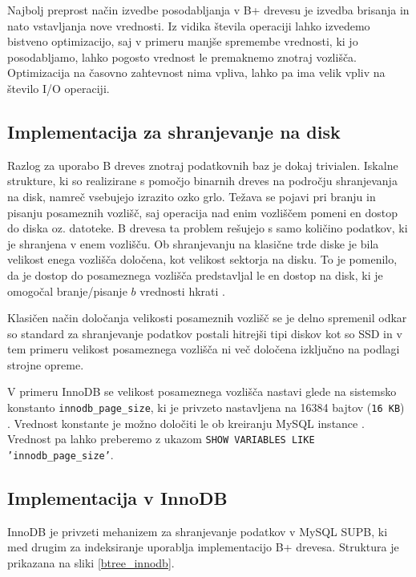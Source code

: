 \documentclass[a4paper,12pt,openright]{book}
\begin{document}
        Najbolj preprost način izvedbe posodabljanja v B+ drevesu je izvedba brisanja in nato vstavljanja nove vrednosti. Iz vidika števila operaciji lahko izvedemo bistveno optimizacijo, saj v primeru manjše spremembe vrednosti, ki jo posodabljamo, lahko pogosto vrednost le premaknemo znotraj vozlišča. Optimizacija na časovno zahtevnost nima vpliva, lahko pa ima velik vpliv na število I/O operaciji.

        \subsection{Implementacija za shranjevanje na disk}
        Razlog za uporabo B dreves znotraj podatkovnih baz je dokaj trivialen. Iskalne strukture, ki so realizirane s pomočjo binarnih dreves na področju shranjevanja na disk, namreč vsebujejo izrazito ozko grlo. Težava se pojavi pri branju in pisanju posameznih vozlišč, saj operacija nad enim vozliščem pomeni en dostop do diska oz. datoteke. B drevesa ta problem rešujejo s samo količino podatkov, ki je shranjena v enem vozlišču. Ob shranjevanju na klasične trde diske je bila velikost enega vozlišča določena, kot velikost sektorja na disku. To je pomenilo, da je dostop do posameznega vozlišča predstavljal le en dostop na disk, ki je omogočal branje/pisanje $b$ vrednosti hkrati \cite{goodrich2011data}.

        Klasičen način določanja velikosti posameznih vozlišč se je delno spremenil odkar so standard za shranjevanje podatkov postali hitrejši tipi diskov kot so SSD in v tem primeru velikost posameznega vozlišča ni več določena izključno na podlagi strojne opreme. 
        
        V primeru InnoDB se velikost posameznega vozlišča nastavi glede na sistemsko konstanto {\tt innodb\_page\_size}, ki je privzeto nastavljena na \num{16384} bajtov ({\tt 16 KB}) \cite{INOODB_PS}. Vrednost konstante je možno določiti le ob kreiranju MySQL instance \cite{MYSQL_SETUP}. Vrednost pa lahko preberemo z ukazom {\tt SHOW VARIABLES LIKE 'innodb\_page\_size'}.

        \subsection{Implementacija v InnoDB}
        \label{MYSQL_BPTREE}

        InnoDB je privzeti mehanizem za shranjevanje podatkov v MySQL SUPB, ki med drugim za indeksiranje uporablja implementacijo B+ drevesa. Struktura je prikazana na sliki \ref{btree_innodb}.
\end{document}
